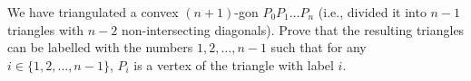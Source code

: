 We have triangulated a convex $(n+1)$-gon $P_0P_1\dots P_n$ (i.e., divided it into $n-1$ triangles with $n-2$ non-intersecting diagonals). Prove that the resulting triangles can be labelled with the numbers $1,2,\dots,n-1$ such that for any $i\in\{1,2,\dots,n-1\}$, $P_i$ is a vertex of the triangle with label $i$.